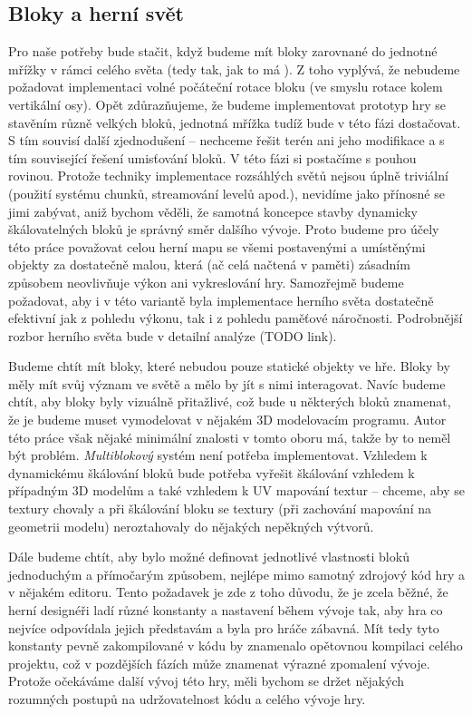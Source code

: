 
\subsection{Bloky a herní svět}
\label{subsec:bloky}

Pro naše potřeby bude stačit, když budeme mít bloky zarovnané do jednotné mřížky v rámci celého světa (tedy tak, jak to má \MC{}).  Z toho vyplývá, že nebudeme požadovat implementaci volné počáteční rotace bloku (ve smyslu rotace kolem vertikální osy). Opět zdůrazňujeme, že budeme implementovat prototyp hry se stavěním různě velkých bloků, jednotná mřížka tudíž bude v této fázi dostačovat. S tím souvisí další zjednodušení -- nechceme řešit terén ani jeho modifikace a s tím související řešení umisťování bloků. V této fázi si postačíme s pouhou rovinou. Protože techniky implementace rozsáhlých světů nejsou úplně triviální (použití systému chunků, streamování levelů apod.), nevidíme jako přínosné se jimi zabývat, aniž bychom věděli, že samotná koncepce stavby dynamicky škálovatelných bloků je správný směr dalšího vývoje. Proto budeme pro účely této práce považovat celou herní mapu se všemi postavenými a umístěnými objekty za dostatečně malou, která (ač celá načtená v paměti) zásadním způsobem neovlivňuje výkon ani vykreslování hry. Samozřejmě budeme požadovat, aby i v této variantě byla implementace herního světa dostatečně efektivní jak z pohledu výkonu, tak i z pohledu paměťové náročnosti. Podrobnější rozbor herního světa bude v detailní analýze (TODO link).

Budeme chtít mít bloky, které nebudou pouze statické objekty ve hře. Bloky by měly mít svůj význam ve světě a mělo by jít s nimi interagovat. Navíc budeme chtít, aby bloky byly vizuálně přitažlivé, což bude u některých bloků znamenat, že je budeme muset vymodelovat v nějakém 3D modelovacím programu. Autor této práce však nějaké minimální znalosti v tomto oboru má, takže by to neměl být problém. \textit{Multiblokový} systém není potřeba implementovat. Vzhledem k dynamickému škálování bloků bude potřeba vyřešit škálování vzhledem k případným 3D modelům a také vzhledem k UV mapování textur -- chceme, aby se textury chovaly  a při škálování bloku se textury (při zachování mapování na geometrii modelu) neroztahovaly do nějakých nepěkných výtvorů. 


Dále budeme chtít, aby bylo možné definovat jednotlivé vlastnosti bloků jednoduchým a přímočarým způsobem, nejlépe mimo samotný zdrojový kód hry a v nějakém editoru. Tento požadavek je zde z toho důvodu, že je zcela běžné, že herní designéři ladí různé konstanty a nastavení během vývoje tak, aby hra co nejvíce odpovídala jejich představám a byla pro hráče zábavná. Mít tedy tyto konstanty pevně zakompilované v kódu by znamenalo opětovnou kompilaci celého projektu, což v pozdějších fázích může znamenat výrazné zpomalení vývoje. Protože očekáváme další vývoj této hry, měli bychom se držet nějakých rozumných postupů na udržovatelnost kódu a celého vývoje hry.

